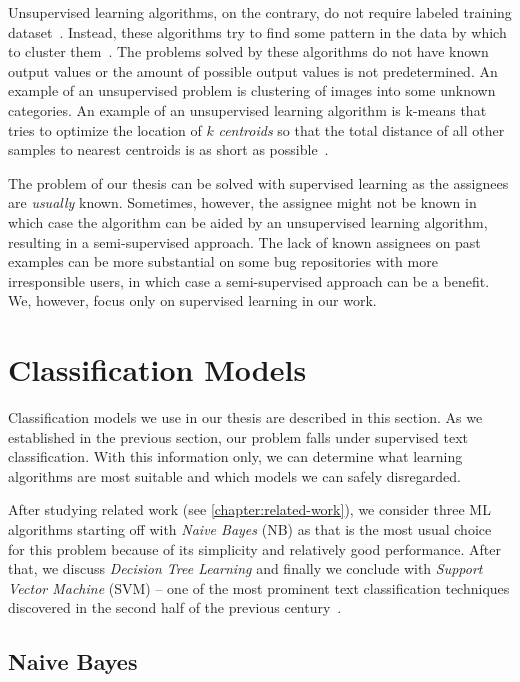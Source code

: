 Unsupervised learning algorithms, on the contrary, do not require labeled training dataset~\cite{donalek2014supervised}. Instead, these algorithms try to find some pattern in the data by which to cluster them~\cite{donalek2014supervised}. The problems solved by these algorithms do not have known output values or the amount of possible output values is not predetermined. An example of an unsupervised problem is clustering of images into some unknown categories. An example of an unsupervised learning algorithm is k-means that tries to optimize the location of $k$ \textit{centroids} so that the total distance of all other samples to nearest centroids is as short as possible~\cite{mitchell1997machine}.

The problem of our thesis can be solved with supervised learning as the assignees are \textit{usually} known. Sometimes, however, the assignee might not be known in which case the algorithm can be aided by an unsupervised learning algorithm, resulting in a semi-supervised approach. The lack of known assignees on past examples can be more substantial on some bug repositories with more irresponsible users, in which case a semi-supervised approach can be a benefit. We, however, focus only on supervised learning in our work.

\section{Classification Models}

Classification models we use in our thesis are described in this section. As we established in the previous section, our problem falls under supervised text classification. With this information only, we can determine what learning algorithms are most suitable and which models we can safely disregarded.

After studying related work (see \autoref{chapter:related-work}), we consider three ML algorithms starting off with \textit{Naive Bayes} (NB) as that is the most usual choice for this problem because of its simplicity and relatively good performance. After that, we discuss \textit{Decision Tree Learning} and finally we conclude with \textit{Support Vector Machine} (SVM) -- one of the most prominent text classification techniques discovered in the second half of the previous century~\cite{vapnik1995svm}.

\subsection{Naive Bayes}

